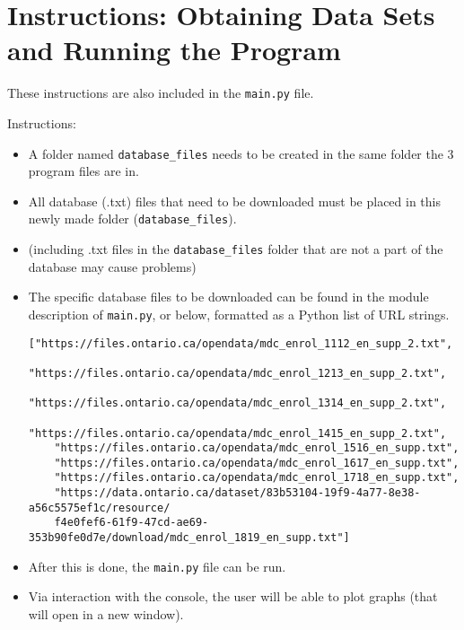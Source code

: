 \documentclass[fontsize=11pt]{article}
\begin{document}
\section*{Instructions: Obtaining Data Sets and Running the Program}

These instructions are also included in the \texttt{main.py} file.

Instructions:
\begin{itemize}
    \item A folder named \texttt{database\_files} needs to be created in the same folder the 3 program files are in.
    \item All database (.txt) files that need to be downloaded must be placed in this newly made folder (\texttt{database\_files}).
    \item (including .txt files in the \texttt{database\_files} folder that are not a part of the database may cause problems)
    \item The specific database files to be downloaded can be found in the module description of \texttt{main.py}, or below, formatted as a Python list of URL strings.

\begin{verbatim}
["https://files.ontario.ca/opendata/mdc_enrol_1112_en_supp_2.txt",
    "https://files.ontario.ca/opendata/mdc_enrol_1213_en_supp_2.txt",
    "https://files.ontario.ca/opendata/mdc_enrol_1314_en_supp_2.txt",
    "https://files.ontario.ca/opendata/mdc_enrol_1415_en_supp_2.txt",
    "https://files.ontario.ca/opendata/mdc_enrol_1516_en_supp.txt",
    "https://files.ontario.ca/opendata/mdc_enrol_1617_en_supp.txt",
    "https://files.ontario.ca/opendata/mdc_enrol_1718_en_supp.txt",
    "https://data.ontario.ca/dataset/83b53104-19f9-4a77-8e38-a56c5575ef1c/resource/
    f4e0fef6-61f9-47cd-ae69-353b90fe0d7e/download/mdc_enrol_1819_en_supp.txt"]
\end{verbatim}

    \item After this is done, the \texttt{main.py} file can be run.
    \item Via interaction with the console, the user will be able to plot graphs (that will open in a new window).

\end{itemize}
\end{document}
